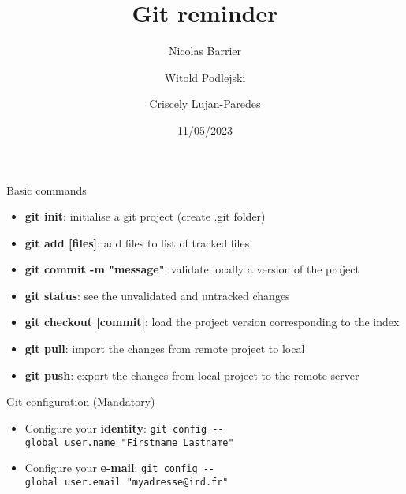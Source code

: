 \documentclass[10pt]{beamer}
\title{Git reminder}
\date{11/05/2023}
\author{Nicolas Barrier \and Witold Podlejski \and Criscely
Lujan-Paredes}
\date{}
\begin{document}
\frame{\titlepage}
\ifdefined\Shaded\renewenvironment{Shaded}{\begin{tcolorbox}[sharp corners, frame hidden, boxrule=0pt, breakable, borderline west={3pt}{0pt}{shadecolor}, enhanced, interior hidden]}{\end{tcolorbox}}\fi

\begin{frame}{Basic commands}
    \begin{itemize}
        \item \textbf{git init}: initialise a git project (create .git folder)
        \item \textbf{git add [files]}: add files to list of tracked files
        \vspace{0.2cm}
        \item \textbf{git commit -m "message"}: validate locally a version of the project
        \vspace{0.2cm}
        \item \textbf{git status}: see the unvalidated and  untracked changes
        \vspace{0.2cm}
        \item \textbf{git checkout [commit]}: load the project version corresponding to the index
        \vspace{0.2cm}
        \item \textbf{git pull}: import the changes from remote project to local
        \vspace{0.2cm}
        \item \textbf{git push}: export the changes from local project to the remote server
        \vspace{0.2cm}
    \end{itemize}
\end{frame}

\begin{frame}[fragile]{Git configuration (Mandatory)}



\begin{itemize}
\item Configure your \textbf{identity}: \texttt{git\ config\ -\/-global\ user.name\ "Firstname\ Lastname"}
\vspace{0.5cm}
\item Configure your \textbf{e-mail}: \texttt{git\ config\ -\/-global\ user.email\ "myadresse@ird.fr"}
\end{itemize}

\end{frame}
\end{document}
